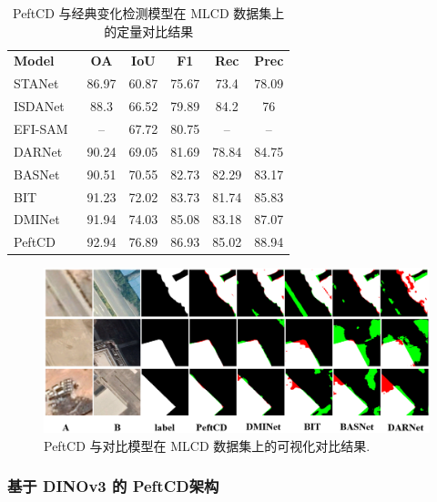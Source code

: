 \begin{table}[!htbp]
\centering
\caption{PeftCD 与经典变化检测模型在 MLCD 数据集上的定量对比结果}
\label{tab:peftcd_mlcd}
\begin{tabular}{l c c c c c}
\toprule
\textbf{Model} & \textbf{OA} & \textbf{IoU} & \textbf{F1} & \textbf{Rec} & \textbf{Prec} \\
STANet~\cite{chen_spatial-temporal_2020}         & 86.97 & 60.87 & 75.67 & 73.4  & 78.09 \\
ISDANet~\cite{h_ren_interactive_2025}            & 88.3  & 66.52 & 79.89 & 84.2  & 76    \\
EFI-SAM~\cite{Huang2025SAMBasedEF}          & -- & 67.72 & 80.75 & -- & -- \\
DARNet~\cite{li_densely_2022}         & 90.24 & 69.05 & 81.69 & 78.84 & 84.75 \\
BASNet~\cite{z_wang_bitemporal_2024}         & 90.51 & 70.55 & 82.73 & 82.29 & 83.17 \\
BIT~\cite{chen_remote_2022}            & 91.23 & 72.02 & 83.73 & 81.74 & 85.83 \\
DMINet~\cite{feng_change_2023}         & 91.94 & 74.03 & 85.08 & 83.18 & 87.07 \\
\midrule
PeftCD & 92.94 & 76.89 & 86.93 & 85.02 & 88.94 \\
\bottomrule
\end{tabular}
\end{table}

\begin{figure}[!htbp]
  \centering
  \includegraphics[width=\textwidth]{paper_figures/基于AI基础模型微调的变化检测模型研究/PeftCD/peftcd_mlcd.png}
  \caption{PeftCD 与对比模型在 MLCD 数据集上的可视化对比结果.}
  \label{fig:peftcd_mlcd}
\end{figure}


\subsubsection{基于 DINOv3 的 PeftCD架构}

